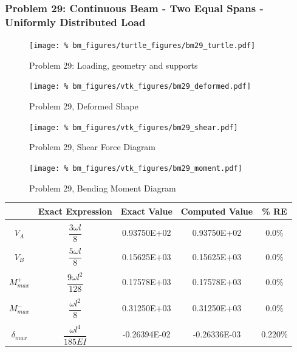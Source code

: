 %
%

\clearpage
\subsubsection{Problem 29: Continuous Beam - Two Equal Spans - Uniformly Distributed Load}
\begin{figure}[h]
    \texttt{[image: \%
                            bm\_figures/turtle\_figures/bm29\_turtle.pdf]}
    \centering
    \caption{Problem 29: Loading, geometry and supports}
    \label{fig:bm29_turtle}
\end{figure}


\begin{figure}[!htb]
    \texttt{[image: \%
                     bm\_figures/vtk\_figures/bm29\_deformed.pdf]}
    \centering
    \caption{Problem 29, Deformed Shape}
    \label{fig:bm29_deformed}
\end{figure}
\begin{figure}[!htb]
    \texttt{[image: \%
                     bm\_figures/vtk\_figures/bm29\_shear.pdf]}
    \centering
    \caption{Problem 29, Shear Force Diagram}
    \label{fig:bm29_shear}
\end{figure}
\begin{figure}[!htb]
    \texttt{[image: \%
                     bm\_figures/vtk\_figures/bm29\_moment.pdf]}
    \centering
    \caption{Problem 29, Bending Moment Diagram}
    \label{fig:bm29_moment}
\end{figure}
\begin{table}[h!]
\centering
\begin{tabular}{ c| c c c c }
    & Exact Expression & Exact Value & Computed Value & \% RE \\ \hline \\
    $V_A$  & $\dfrac{3\omega l}{8}$ & 0.93750E+02 & 0.93750E+02 & 0.0\% \\ \\
    $V_B$  & $\dfrac{5\omega l}{8}$ & 0.15625E+03 & 0.15625E+03 & 0.0\% \\ \\
    $M_{max}^+$ & $\dfrac{9 \omega l^2}{128}$ & 0.17578E+03 & 0.17578E+03 & 0.0\% \\ \\
    $M_{max}^-$ & $\dfrac{\omega l^2}{8}$ & 0.31250E+03 & 0.31250E+03 & 0.0\% \\ \\
    $\delta_{max}$ & $\dfrac{\omega l^4}{185EI}$ & -0.26394E-02 & -0.26336E-03 & 0.220\% \\
\end{tabular}
\end{table}

